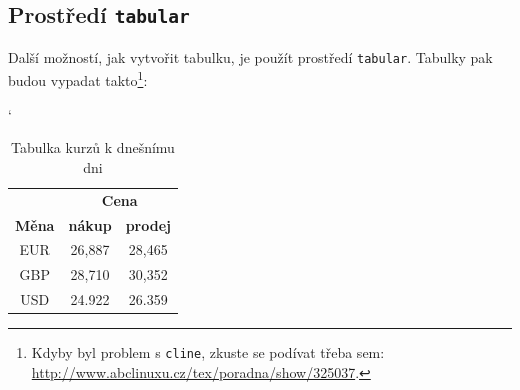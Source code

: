 \documentclass[a4paper, 11pt]{article}
\begin{document}
    \subsection{Prostředí \texttt{tabular}}
        Další možností, jak vytvořit tabulku, je použít prostředí \verb|tabular|. Tabulky pak budou vypadat takto\footnote{Kdyby byl problem s \texttt{cline}, zkuste se podívat třeba sem: \href{http://www.abclinuxu.cz/tex/poradna/show/325037}{http://www.abclinuxu.cz/tex/poradna/show/325037}.}:
        \begin{table}[ht]
            \catcode` 
            \begin{center}
                \begin{tabular}{| c | c | c |} \hline 
                    & \multicolumn{2}{|c|}{\textbf{Cena}} \\ 
                    \cline{2-3}
                    \textbf{Měna} & \textbf{nákup} & \textbf{prodej} \\ \hline
                    EUR & 26,887 & 28,465\\
                    GBP & 28,710 & 30,352\\
                    USD & 24.922 & 26.359\\ \hline
                \end{tabular}
                \caption{Tabulka kurzů k dnešnímu dni}
                \label{tabKurzu}
            \end{center}
        \end{table}
        
\end{document}
